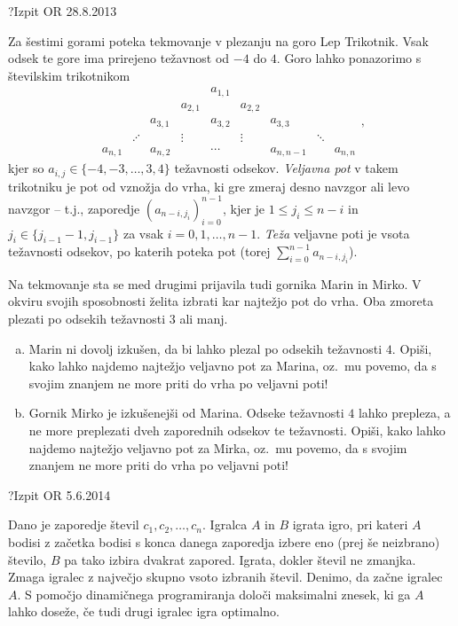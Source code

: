 \begin{naloga}{?}{Izpit OR 28.8.2013}
\begin{vprasanje}
Za šestimi gorami poteka tekmovanje v plezanju na goro Lep Trikotnik.
Vsak odsek te gore ima prirejeno težavnost od $-4$ do $4$.
Goro lahko ponazorimo s številskim trikotnikom
$$
\begin{array}{ccccccccc}
                &&&& a_{1,1} \\
            &&& a_{2,1} && a_{2,2} \\
        && a_{3,1} && a_{3,2} && a_{3,3} \\
     & \iddots && \vdots && \vdots && \ddots \\
a_{n,1} && a_{n,2} && \cdots && a_{n,n-1} && a_{n,n}
\end{array} ,
$$
kjer so $a_{i,j} \in \{-4, -3, \dots, 3, 4\}$ težavnosti odsekov.
{\em Veljavna pot} v takem trikotniku je pot od vznožja do vrha,
ki gre zmeraj desno navzgor ali levo navzgor
-- t.j., zaporedje $(a_{n-i, j_i})_{i=0}^{n-1}$,
kjer je $1 \le j_i \le n-i$ in $j_i \in \{j_{i-1}-1, j_{i-1}\}$
za vsak $i = 0, 1, \dots, n-1$.
{\em Teža} veljavne poti je vsota težavnosti odsekov,
po katerih poteka pot (torej $\sum_{i=0}^{n-1} a_{n-i, j_i}$).

Na tekmovanje sta se med drugimi prijavila tudi gornika Marin in Mirko.
V okviru svojih sposobnosti želita izbrati kar najtežjo pot do vrha.
Oba zmoreta plezati po odsekih težavnosti $3$ ali manj.

\begin{enumerate}[(a)]
\item Marin ni dovolj izkušen, da bi lahko plezal po odsekih težavnosti $4$.
Opiši, kako lahko najdemo najtežjo veljavno pot za Marina,
oz.~mu povemo, da s svojim znanjem ne more priti do vrha po veljavni poti!

\item Gornik Mirko je izkušenejši od Marina.
Odseke težavnosti $4$ lahko prepleza,
a ne more preplezati dveh zaporednih odsekov te težavnosti.
Opiši, kako lahko najdemo najtežjo veljavno pot za Mirka,
oz.~mu povemo, da s svojim znanjem ne more priti do vrha po veljavni poti!
\end{enumerate}
\end{vprasanje}
\begin{odgovor}
\end{odgovor}
\end{naloga}


\begin{naloga}{?}{Izpit OR 5.6.2014}
\begin{vprasanje}
Dano je zaporedje števil $c_1, c_2, \dots, c_n$.
Igralca $A$ in $B$ igrata igro,
pri kateri $A$ bodisi z začetka bodisi s konca danega zaporedja
izbere eno (prej še neizbrano) število,
$B$ pa tako izbira dvakrat zapored.
Igrata, dokler števil ne zmanjka.
Zmaga igralec z največjo skupno vsoto izbranih števil.
Denimo, da začne igralec $A$.
S pomočjo dinamičnega programiranja določi maksimalni znesek,
ki ga $A$ lahko doseže, če tudi drugi igralec igra optimalno.
\end{vprasanje}
\begin{odgovor}
\end{odgovor}
\end{naloga}


